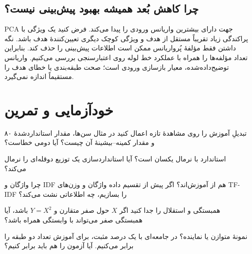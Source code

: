 \subsection*{چرا کاهش بُعد همیشه بهبود پیش‌بینی نیست؟}
PCA جهت دارای بیشترین واریانس ورودی را پیدا می‌کند. فرض کنید یک ویژگی با پراکندگی زیاد تقریباً مستقل از هدف و ویژگی کوچک دیگری تعیین‌کنندهٔ هدف باشد. نگه داشتن فقط مؤلفهٔ پُرواریانس ممکن است اطلاعات پیش‌بینی را حذف کند. بنابراین تعداد مؤلفه‌ها را همراه با عملکرد خط لوله روی اعتبارسنجی بررسی می‌کنیم. واریانس توضیح‌داده‌شده، معیار بازسازی ورودی است؛ صحت طبقه‌بندی یا خطای هدف را مستقیماً اندازه نمی‌گیرد.

\section{خودآزمایی و تمرین}
\begin{selftests}
\begin{selftest}{تبدیلِ آموزش را روی مشاهدهٔ تازه اعمال کنید}
در مثال سن‌ها، مقدار استانداردشدهٔ ۸۰ و مقدار کمینه–بیشینهٔ آن چیست؟ آیا دومی خطاست؟
\end{selftest}
\begin{selftest}{استاندارد با نرمال یکسان است؟}
آیا استانداردسازی یک توزیع دو‌قله‌ای را نرمال می‌کند؟
\end{selftest}
\begin{selftest}{چرا واژگان و IDF هم از آموزش‌اند؟}
اگر پیش از تقسیم داده واژگان و وزن‌های TF-IDF را بسازیم، چه اطلاعاتی نشت می‌کند؟
\end{selftest}
\begin{selftest}{همبستگی و استقلال را جدا کنید}
اگر $X$ حول صفر متقارن و $Y=X^2$ باشد، آیا همبستگی صفر می‌تواند با وابستگی همراه باشد؟
\end{selftest}
\begin{selftest}{نمونهٔ متوازن یا نماینده؟}
در جامعه‌ای با یک درصد مثبت، برای آموزش تعداد دو طبقه را برابر می‌کنیم. آیا آزمون را هم باید برابر کنیم؟

\end{selftest}
\end{selftests}
